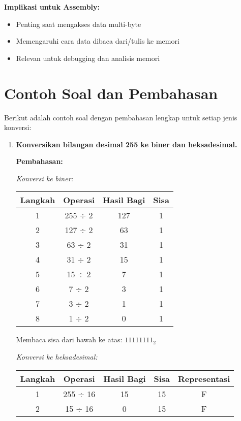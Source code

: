 \documentclass[../main.tex]{subfiles}
\begin{document}
\textbf{Implikasi untuk Assembly:}
\begin{itemize}
    \item Penting saat mengakses data multi-byte
    \item Memengaruhi cara data dibaca dari/tulis ke memori
    \item Relevan untuk debugging dan analisis memori
\end{itemize}

\section{Contoh Soal dan Pembahasan}\label{sec:pengenalan-contoh}

Berikut adalah contoh soal dengan pembahasan lengkap untuk setiap jenis konversi:

\begin{enumerate}
    \item \textbf{Konversikan bilangan desimal 255 ke biner dan heksadesimal.}
    
    \textbf{Pembahasan:}
    
    \textit{Konversi ke biner:}
    \begin{center}
    \begin{tabular}{|c|c|c|c|}
    \hline
    \textbf{Langkah} & \textbf{Operasi} & \textbf{Hasil Bagi} & \textbf{Sisa} \\
    \hline
    1 & 255 $\div$ 2 & 127 & 1 \\
    2 & 127 $\div$ 2 & 63 & 1 \\
    3 & 63 $\div$ 2 & 31 & 1 \\
    4 & 31 $\div$ 2 & 15 & 1 \\
    5 & 15 $\div$ 2 & 7 & 1 \\
    6 & 7 $\div$ 2 & 3 & 1 \\
    7 & 3 $\div$ 2 & 1 & 1 \\
    8 & 1 $\div$ 2 & 0 & 1 \\
    \hline
    \end{tabular}
    \end{center}
    
    Membaca sisa dari bawah ke atas: \(11111111_2\)
    
    \textit{Konversi ke heksadesimal:}
    \begin{center}
    \begin{tabular}{|c|c|c|c|c|}
    \hline
    \textbf{Langkah} & \textbf{Operasi} & \textbf{Hasil Bagi} & \textbf{Sisa} & \textbf{Representasi} \\
    \hline
    1 & 255 $\div$ 16 & 15 & 15 & F \\
    2 & 15 $\div$ 16 & 0 & 15 & F \\
    \hline
    \end{tabular}
    \end{center}
    

\end{enumerate}
\end{document}
